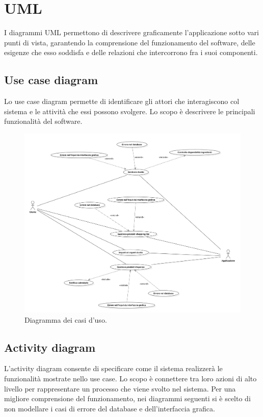 \chapter{UML}

I diagrammi UML permettono di descrivere graficamente l'applicazione sotto vari punti di vista, garantendo la comprensione del funzionamento del software, delle esigenze che esso soddisfa e delle relazioni che intercorrono fra i suoi componenti.

\section{Use case diagram}

Lo use case diagram permette di identificare gli attori che interagiscono col sistema e le attività che essi possono svolgere. Lo scopo è descrivere le principali funzionalità del software.

\begin{figure}[h!]
    \includegraphics[width=\linewidth]{images/use-case.png}
    \caption{Diagramma dei casi d'uso.}
    \label{fig:usecase}
\end{figure}

\newpage

\section{Activity diagram}

L'activity diagram consente di specificare come il sistema realizzerà le funzionalità mostrate nello use case. Lo scopo è connettere tra loro azioni di alto livello per rappresentare un processo che viene svolto nel sistema. Per una migliore comprensione del funzionamento, nei diagrammi seguenti si è scelto di non modellare i casi di errore del database e dell'interfaccia grafica. 

